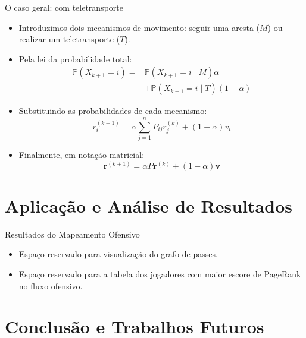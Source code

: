\documentclass[aspectratio=1610,10pt]{beamer}
\begin{document}
\begin{frame}{O caso geral: com teletransporte}
\begin{itemize}
    \setlength{\itemsep}{\medskipamount}
    \item Introduzimos dois mecanismos de movimento:
    seguir uma aresta ($M$) ou realizar um teletransporte ($T$).

    \item Pela lei da probabilidade total:
    \[
    \begin{aligned}
    \mathbb{P}(X_{k+1}=i) ={}& \mathbb{P}(X_{k+1}=i\mid M)\alpha\\
    &+\mathbb{P}(X_{k+1}=i\mid T)(1-\alpha)
    \end{aligned}
    \]

    \item Substituindo as probabilidades de cada mecanismo:
    \[
    r_i^{(k+1)} = \alpha\sum_{j=1}^{n}P_{ij}r_j^{(k)} +(1-\alpha)v_i
    \]

    \item Finalmente, em notação matricial:
    \[
    \boxed{ \mathbf{r}^{(k+1)} = \alpha P\mathbf{r}^{(k)} +(1-\alpha)\mathbf{v} }
    \]
\end{itemize}
\end{frame}

\section{Aplicação e Análise de Resultados}

  \begin{frame}{Resultados do Mapeamento Ofensivo}
    \begin{itemize}
        \item Espaço reservado para visualização do grafo de passes.
        \item Espaço reservado para a tabela dos jogadores com maior escore de PageRank no fluxo ofensivo.
    \end{itemize}
  \end{frame}

\section{Conclusão e Trabalhos Futuros}
\end{document}
